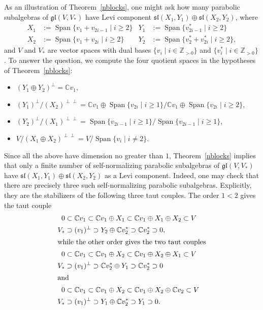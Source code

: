 \documentclass{amsart}
\theoremstyle{definition}
\theoremstyle{remark}
\numberwithin{equation}{section}
\newcommand {\Z} {\mathbb{Z}}
\newcommand {\C} {\mathbb{C}}
\def\gl{\mathfrak {gl}}
\def\sl{\mathfrak{sl}}
\newcommand {\Span}{\operatorname{Span}}
\begin{document}
As an illustration of Theorem~\ref{nblocks}, one might ask how many parabolic subalgebras of $\gl(V,V_*)$ have Levi component $\sl(X_1 , Y_1) \oplus \sl(X_2 , Y_2)$, where 
\begin{align*}
X_1 & :=  \Span \{ v_1 + v_{2i - 1} \mid i \geq 2 \} & Y_1 & :=   \Span \{ v_{2i - 1}^* \mid i \geq 2  \} \\
X_2 & :=  \Span \{ v_1 + v_{2i} \mid i \geq 2 \} & Y_2 & :=  \Span \{  v_2^* + v_{2i}^* \mid i \geq 2  \},
\end{align*}
and $V$ and $V_*$ are vector spaces with dual bases $\{ v_i \mid i \in \Z_{> 0} \}$ and $\{ v_i^* \mid i \in \Z_{> 0} \}$.  
To answer the question, we compute the four quotient spaces in the hypotheses of Theorem~\ref{nblocks}:
\begin{itemize}
\item $(Y_1 \oplus Y_2)^\perp = \C v_1 $,
\item $(Y_1)^\perp / (X_2)^{\perp \perp} = \C v_1 \oplus \Span \{ v_{2i} \mid i \geq 1 \} /  \C v_1 \oplus \Span \{ v_{2i} \mid i \geq 2 \} $,
\item $(Y_2)^\perp / (X_1)^{\perp \perp} =  \Span \{ v_{2i -1} \mid i \geq 1 \} / \Span \{ v_{2i - 1} \mid i \geq 1 \}$,
\item $V / (X_1 \oplus X_2)^{\perp \perp} = V / \Span \{ v_i \mid i \neq 2 \}$.
\end{itemize}
Since all the above have dimension no greater than $1$, Theorem~\ref{nblocks} implies that only a finite number of self-normalizing parabolic subalgebras of $\gl(V,V_*)$ have $\sl(X_1 , Y_1) \oplus \sl(X_2 , Y_2)$ as a Levi component.  Indeed, one may check that there are precisely three such self-normalizing parabolic subalgebras.  Explicitly, they are the stabilizers of the following three taut couples.  The order $1 < 2$ gives the taut couple
\begin{align*}
0 & \subset \C v_1  \subset  \C v_1 \oplus X_1 \subset \C v_1 \oplus X_1 \oplus X_2 \subset V \\
V_* &  \supset (v_1)^\perp  \supset Y_2 \oplus \C v_2^* \supset \C v_2^* \supset  0 , \\
\intertext{while the other order gives the two taut couples}
0 & \subset \C v_1  \subset  \C v_1 \oplus X_2 \subset \C v_1 \oplus X_2 \oplus X_1 \subset V \\
V_* &  \supset (v_1)^\perp  \supset  \C v_2^* \oplus Y_1 \supset \C v_2^* \supset  0 \\
\intertext{and}
0 & \subset \C v_1  \subset  \C v_1 \oplus X_2 \subset \C v_1 \oplus X_2 \oplus \C v_2 \subset V \\
V_* &  \supset (v_1)^\perp  \supset Y_1 \oplus \C v_2^* \supset Y_1 \supset  0.  
\end{align*}
\end{document}

